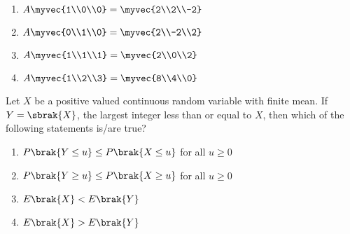 \begin{enumerate}
\item $A\myvec{1\\0\\0} = \myvec{2\\2\\-2}$
\item $A\myvec{0\\1\\0} = \myvec{2\\-2\\2}$
\item $A\myvec{1\\1\\1} = \myvec{2\\0\\2}$
\item $A\myvec{1\\2\\3} = \myvec{8\\4\\0}$
\end{enumerate}
\item Let $X$ be a positive valued continuous random variable with finite mean.
      If $Y = \sbrak{X}$, the largest integer less than or equal to $X$, then which of the
      following statements is/are true?

\begin{enumerate}
\item $P\brak{Y \leq u} \leq P\brak{X \leq u}$ for all $u \geq 0$
\item $P\brak{Y \geq u} \leq P\brak{X \geq u}$ for all $u \geq 0$
\item $E\brak{X} < E\brak{Y}$
\item $E\brak{X} > E\brak{Y}$
\end{enumerate}

